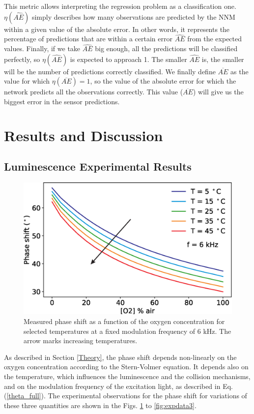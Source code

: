 \documentclass[final,5p,times,twocolumn]{elsarticle}
\begin{document}
This metric allows interpreting the regression problem as a classification one. $\eta(\hat{AE})$ simply describes how many observations are predicted by the NNM within a given value of the absolute error. In other words, it represents the percentage of predictions that are within a certain error $\hat{AE}$ from the expected values. Finally, if we take $\hat{AE}$ big enough, all the predictions will be classified perfectly, so $\eta(\hat{AE})$ is expected to approach 1. The smaller $\hat{AE}$ is, the smaller will be the number of predictions correctly classified. We finally define $\overline{AE}$ as the value for which $\eta(\overline{AE})=1$, so the value of the absolute error for which the network predicts all the observations correctly. This value ($\overline{AE}$) will give us the biggest error in the sensor predictions.


\section{Results and Discussion}
\label{Results}

\subsection{Luminescence Experimental Results}

\begin{figure}[b!]
\centering
\includegraphics[width=8.2 cm]{phase_O2_T.eps}
\caption{Measured phase shift as a function of the oxygen concentration for selected temperatures at a fixed modulation frequency of 6 kHz. The arrow marks increasing temperatures.}
\label{fig:expdata1}
\end{figure}

As described in Section \ref{Theory}, the phase shift depends non-linearly on the oxygen concentration according to the Stern-Volmer equation. It depends also on the temperature, which influences the luminescence and the collision mechanisms, and on the modulation frequency of the excitation light, as described in Eq. (\ref{theta_full}). The experimental observations for the phase shift for variations of these three quantities are shown in the Figs. \ref{fig:expdata1} to \ref{fig:expdata3}.
\end{document}

